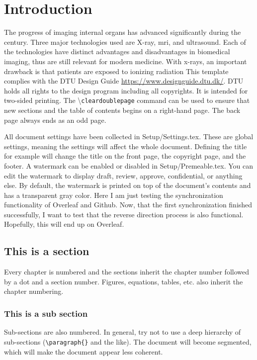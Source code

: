 \chapter{Introduction}
The progress of imaging internal organs has advanced significantly during the  century. Three major technologies used are X-ray, \gls{mri}, and ultrasound. Each of the technologies have distinct advantages and disadvantages in biomedical imaging, thus are still relevant for modern medicine. With x-rays, an important drawback is that patients are exposed to ionizing radiation 
\cite{ShungUltrasound_Book,Shung1976,JensenUltrasoundBook,Jensen_Algorithms}
\cite{1999_SummerSchool_Notes,Szabo_UltrasoundBook_2}
This template complies with the DTU Design Guide \url{https://www.designguide.dtu.dk/}. DTU holds all rights to the design program including all copyrights. It is intended for two-sided printing. The \textbackslash \texttt{cleardoublepage} command can be used to ensure that new sections and the table of contents begins on a right-hand page. The back page always ends as an odd page. \cite{Jensen_Analysis_PW_1996}

All document settings have been collected in Setup/Settings.tex. These are global settings, meaning the settings will affect the whole document. Defining the title for example will change the title on the front page, the copyright page, and the footer. A watermark can be enabled or disabled in Setup/Premeable.tex. You can edit the watermark to display draft, review, approve, confidential, or anything else. By default, the watermark is printed on top of the document's contents and has a transparent gray color. Here I am just testing the synchronization functionality of Overleaf and Github. Now, that the first synchronization finished successfully, I want to test that the reverse direction process is also functional. Hopefully, this will end up on Overleaf.

\section{This is a section}
Every chapter is numbered and the sections inherit the chapter number followed by a dot and a section number. Figures, equations, tables, etc. also inherit the chapter numbering. 

\subsection{This is a sub section}
Sub-sections are also numbered. In general, try not to use a deep hierarchy of sub-sections (\texttt{\textbackslash paragraph\{\}} and the like). The document will become segmented, which will make the document appear less coherent. 

